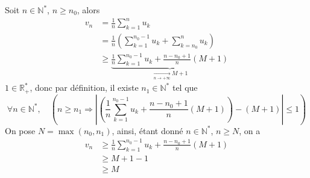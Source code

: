 \documentclass[17pt]{article}
\def\N{\mathbb N}
\def\Rpe{\mathbb R_+^*}
\def\implique{\Longrightarrow}
\begin{document}
\begin{enumerate}
		Soit $n\in\N^*$, $n\geq n_0$, alors
		\begin{align*}
			v_n &= \frac1n \sum_{k=1}^nu_k\\
				&= \frac1n \left(\sum_{k=1}^{n_0-1}u_k+\sum_{k=n_0}^{n}u_k\right)\\
				&\geq \underbrace{\frac1n\sum_{k=1}^{n_0-1}u_k + \frac{n-n_0+1}n (M+1)}_{\xrightarrow[n\rightarrow +\infty ]{}M+1}
		\end{align*}
		$1\in\Rpe$, donc par définition, il existe $n_1\in\N^*$ tel que \[\forall n\in\N^*,\quad \left(n\geq n_1\implique \left|\left(\frac1n\sum_{k=1}^{n_0-1}u_k + \frac{n-n_0+1}n (M+1)\right)-(M+1)\right|\leq 1\right)\]
		On pose $N=\max(n_0,n_1)$, ainsi, étant donné $n\in\N^*$, $n\geq N$, on a  
		\begin{align*}
			v_n &\geq \frac1n\sum_{k=1}^{n_0-1}u_k + \frac{n-n_0+1}n (M+1)\\
				&\geq M+1 - 1\\
				&\geq M
		\end{align*}
	\end{enumerate}
\end{document}
